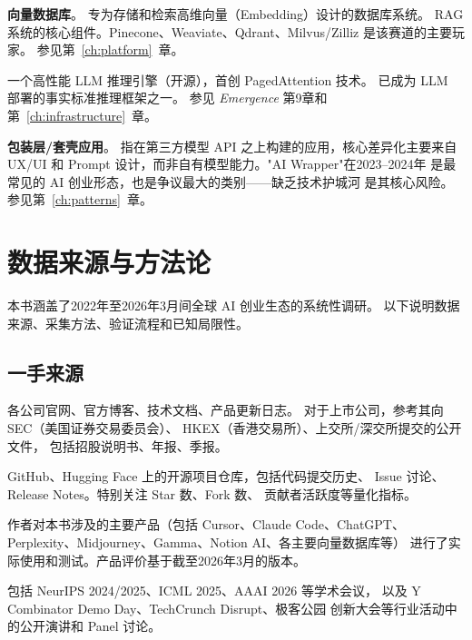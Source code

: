 \begin{description}[style=nextline, leftmargin=2.5cm, labelwidth=2.3cm, font=\bfseries]
\item[Vector Database]
\textbf{向量数据库}。
专为存储和检索高维向量（Embedding）设计的数据库系统。
RAG 系统的核心组件。Pinecone、Weaviate、Qdrant、Milvus/Zilliz
是该赛道的主要玩家。
参见第~\ref{ch:platform}~章。

\item[vLLM]
一个高性能 LLM 推理引擎（开源），首创 PagedAttention 技术。
已成为 LLM 部署的事实标准推理框架之一。
参见 \textit{Emergence} 第9章和第~\ref{ch:infrastructure}~章。

\item[Wrapper]
\textbf{包装层/套壳应用}。
指在第三方模型 API 之上构建的应用，核心差异化主要来自 UX/UI
和 Prompt 设计，而非自有模型能力。"AI Wrapper"在2023--2024年
是最常见的 AI 创业形态，也是争议最大的类别——缺乏技术护城河
是其核心风险。
参见第~\ref{ch:patterns}~章。

\end{description}


\clearpage
\section{数据来源与方法论}
\label{sec:appendix-sources}

本书涵盖了2022年至2026年3月间全球 AI 创业生态的系统性调研。
以下说明数据来源、采集方法、验证流程和已知局限性。

\subsection{一手来源}

\begin{description}[style=nextline, leftmargin=1em]

\item[公司官方信息]
各公司官网、官方博客、技术文档、产品更新日志。
对于上市公司，参考其向 SEC（美国证券交易委员会）、
HKEX（香港交易所）、上交所/深交所提交的公开文件，
包括招股说明书、年报、季报。

\item[开源代码仓库]
GitHub、Hugging Face 上的开源项目仓库，包括代码提交历史、
Issue 讨论、Release Notes。特别关注 Star 数、Fork 数、
贡献者活跃度等量化指标。

\item[产品实测]
作者对本书涉及的主要产品（包括 Cursor、Claude Code、ChatGPT、
Perplexity、Midjourney、Gamma、Notion AI、各主要向量数据库等）
进行了实际使用和测试。产品评价基于截至2026年3月的版本。

\item[行业会议与访谈]
包括 NeurIPS 2024/2025、ICML 2025、AAAI 2026 等学术会议，
以及 Y Combinator Demo Day、TechCrunch Disrupt、极客公园
创新大会等行业活动中的公开演讲和 Panel 讨论。

\end{description}

